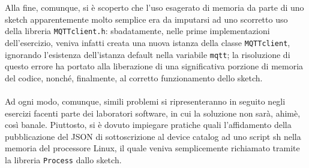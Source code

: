 \documentclass[12pt,a4paper]{article}
\begin{document}
Alla fine, comunque, si è scoperto che l'uso esagerato di memoria da parte di uno sketch apparentemente molto semplice era da imputarsi ad uno scorretto uso della libreria \verb|MQTTclient.h|: sbadatamente, nelle prime implementazioni dell'esercizio, veniva infatti creata una nuova istanza della classe \verb|MQTTclient|, ignorando l'esistenza dell'istanza default nella variabile \verb|mqtt|; la risoluzione di questo errore ha portato alla liberazione di una significativa porzione di memoria del codice, nonché, finalmente, al corretto funzionamento dello sketch.
\\ \\
Ad ogni modo, comunque, simili problemi si ripresenteranno in seguito negli esercizi facenti parte dei laboratori software, in cui la soluzione non sarà, ahimè, così banale. Piuttosto, si è dovuto impiegare pratiche quali l'affidamento della pubblicazione del JSON di sottoscrizione al device catalog ad uno script sh nella memoria del processore Linux, il quale veniva semplicemente richiamato tramite la libreria \verb|Process| dallo sketch.
\end{document}
